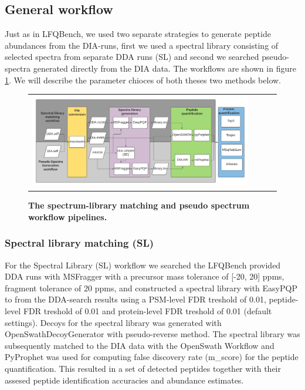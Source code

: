 \documentclass[10pt,letterpaper]{article}
\begin{document}
\subsection*{General workflow}

Just as in LFQBench, we used two separate strategies to generate peptide abundances from the DIA-runs, first we used a spectral library consisting of selected spectra from separate DDA runs (SL) and second we searched pseudo-spectra generated directly from the DIA data. The workflows are shown in figure \ref{fig:flowchart}. We will describe the parameter chioces of both theses two methods below.

\begin{figure}[htp]
    \centering
    \begin{tabular}{lclc} 


        \includegraphics[width=1.1\linewidth]{../../result/report_plots/DIA_benchmark_flowchart_color} 
    \end{tabular}

        \caption{{\bf The spectrum-library matching and pseudo spectrum workflow pipelines.}}
      \label{fig:flowchart}
\end{figure}



\subsubsection*{Spectral library matching (SL)}

For the Spectral Library (SL) workflow we searched the LFQBench provided DDA runs with MSFragger\cite{kong2017msfragger} with a precursor mass tolerance of [-20, 20] ppms, fragment tolerance of 20 ppms, and constructed a spectral library with EasyPQP \cite{easypqp} to from the DDA-search results using a PSM-level FDR treshold of 0.01, peptide-level FDR treshold of 0.01 and protein-level FDR treshold of 0.01 (default settings). Decoys for the spectral library was generated with OpenSwathDecoyGenerator with pseudo-reverse method. The spectral library was subsequently matched to the DIA data with the OpenSwath Workflow and  PyProphet\cite{teleman2015diana} was used for computing false discovery rate (m\_score) for the peptide quantification. This resulted in a set of detected peptides together with their assesed peptide identification accuracies and abundance estimates.
\end{document}
